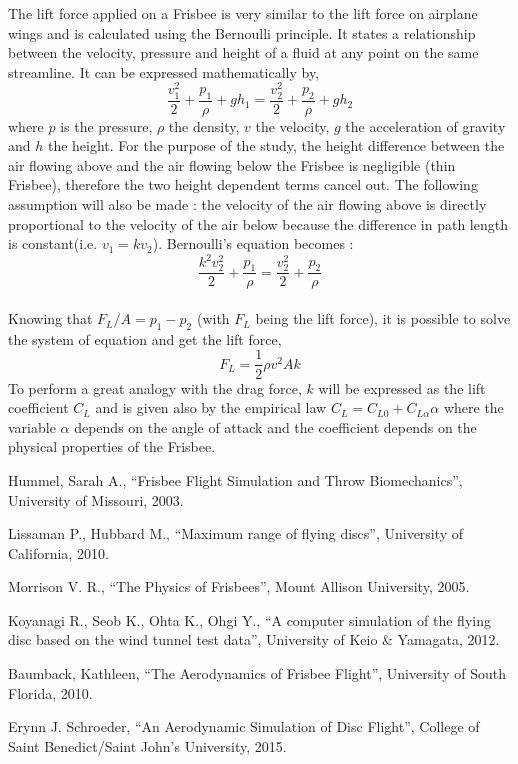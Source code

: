 \documentclass[10pt,a4paper]{report}
\begin{document}
The lift force applied on a Frisbee is very similar to the lift force on
airplane wings and is calculated using the Bernoulli principle. It states a relationship between the velocity, pressure and height of a fluid at any point on the same streamline. It can be expressed mathematically by,
\[\frac{v_1^2}{2} + \frac{p_1}{\rho} + gh_1 = \frac{v_2^2}{2} + \frac{p_2}{\rho} + gh_2\]
where $p$ is the pressure, $\rho$ the density, $v$ the velocity, $g$ the acceleration of gravity and $h$ the height. For the purpose of the study, the height difference between the air flowing above and the air flowing below the Frisbee is negligible (thin Frisbee), therefore the two height dependent terms cancel out. The following assumption will also be made : the velocity of the air flowing above is directly proportional to the velocity of the air below because the difference in path length is constant(i.e. $v_1 = kv_2$). Bernoulli's equation becomes :
\\
\[\frac{k^2v_2^2}{2} + \frac{p_1}{\rho} = \frac{v_2^2}{2} + \frac{p_2}{\rho}\]
\\
Knowing that $F_L/A = p_1 - p_2$ (with $F_L$ being the lift force), it is possible to solve the system of equation and get the lift force,
\[F_L = \frac{1}{2} \rho v^2 A k \]
To perform a great analogy with the drag force, $k$ will be expressed as the lift coefficient $C_L$ and is given also by the empirical law $C_L = C_{L0} + C_{L \alpha} \alpha$ where the variable $\alpha$ depends on the angle of attack and the coefficient depends on the physical properties of the Frisbee.

\begin{thebibliography}{9}

  Hummel, Sarah A.,
  “Frisbee Flight Simulation and Throw Biomechanics”,
  University of Missouri,
  2003.
  
  Lissaman P., Hubbard M.,
  “Maximum range of flying discs”,
  University of California,
  2010.
  
  Morrison V. R.,
  “The Physics of Frisbees”,
  Mount Allison University,
  2005.

  Koyanagi R., Seob K., Ohta K., Ohgi Y.,
  “A computer simulation of the flying disc based on the wind tunnel test data”,
  University of Keio \& Yamagata,
  2012.
  
  Baumback, Kathleen,
  “The Aerodynamics of Frisbee Flight”,
  University of South Florida,
  2010.
  
  Erynn J. Schroeder,
  “An Aerodynamic Simulation of Disc Flight”,
  College of Saint Benedict/Saint John's University,
  2015.

\end{thebibliography}
\end{document}
